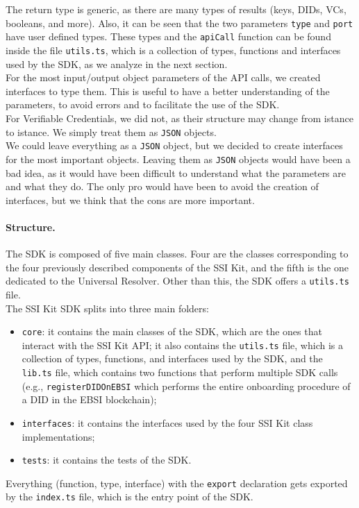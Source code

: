 The return type is generic, as there are many types of results (keys, DIDs, VCs,
booleans, and more). Also, it can be seen that the two parameters \texttt{type} and
\texttt{port} have user defined types. These types and the \texttt{apiCall} function 
can be found inside the file \texttt{utils.ts}, which is a collection of types, 
functions and interfaces used by the SDK, as we analyze in the next section.
\vspace{0.3cm}\\
For the most input/output object parameters of the API calls, we created interfaces
to type them. This is useful to have a better understanding of the parameters, to 
avoid errors and to facilitate the use of the SDK.\\
For Verifiable Credentials, we did not, as their structure may change from istance
to istance. We simply treat them as \texttt{JSON} objects.\\
We could leave everything as a \texttt{JSON} object, but we decided to create interfaces for
the most important objects. Leaving them as \texttt{JSON} objects would have been a bad idea,
as it would have been difficult to understand what the parameters are and what they
do. The only pro would have been to avoid the creation of interfaces, but we think
that the cons are more important.

\paragraph{Structure.}
The SDK is composed of five main classes. Four are the classes corresponding to the 
four previously described components of the SSI Kit, and the fifth is the one dedicated
to the Universal Resolver. Other than this, the SDK offers a \texttt{utils.ts} file.
\vspace{0.3cm}\\
The SSI Kit SDK splits into three main folders:
\begin{itemize}
    \item \texttt{core}: it contains the main classes of the SDK, which are the
    ones that interact with the SSI Kit API; it also contains the \texttt{utils.ts}
    file, which is a collection of types, functions, and interfaces used by the SDK,
    and the \texttt{lib.ts} file, which contains two functions that perform multiple
    SDK calls (e.g., \texttt{registerDIDOnEBSI} which performs the entire onboarding
    procedure of a DID in the EBSI blockchain);
    \item \texttt{interfaces}: it contains the interfaces used by the four SSI Kit
    class implementations;
    \item \texttt{tests}: it contains the tests of the SDK.
\end{itemize}
Everything (function, type, interface) with the \texttt{export} declaration gets exported by the \texttt{index.ts}
file, which is the entry point of the SDK.

